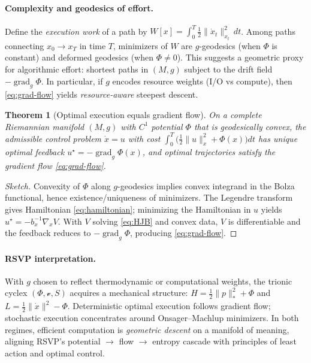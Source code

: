 \documentclass[12pt,a4paper]{article}
\theoremstyle{plain}
\newtheorem{theorem}{Theorem}[section]
\theoremstyle{definition}
\theoremstyle{remark}
\newcommand{\Phifield}{\Phi}
\newcommand{\vfield}{\mathcal{v}}
\newcommand{\Sfield}{S}
\begin{document}
\paragraph{Complexity and geodesics of effort.}
Define the \emph{execution work} of a path by $W[x]=\int_{0}^{T}\tfrac{1}{2}\|\dot x_t\|_{x_t}^{2}\,dt$. Among paths connecting $x_0\!\to\!x_T$ in time $T$, minimizers of $W$ are $g$-geodesics (when $\Phifield$ is constant) and deformed geodesics (when $\Phifield\neq 0$). This suggests a geometric proxy for algorithmic effort: shortest paths in $(M,g)$ subject to the drift field $-\operatorname{grad}_{g}\Phifield$. In particular, if $g$ encodes resource weights (I/O vs compute), then \eqref{eq:grad-flow} yields \emph{resource-aware} steepest descent.

\begin{theorem}[Optimal execution equals gradient flow]
\label{thm:optimal-equals-gradient}
On a complete Riemannian manifold $(M,g)$ with $C^{1}$ potential $\Phifield$ that is geodesically convex, the admissible control problem $\dot x=u$ with cost $\int_{0}^{T}\big(\tfrac{1}{2}\|u\|_{x}^{2}+\Phifield(x)\big)dt$ has unique optimal feedback $u^{\star}=-\operatorname{grad}_{g}\Phifield(x)$, and optimal trajectories satisfy the gradient flow \eqref{eq:grad-flow}.
\end{theorem}

\begin{proof}[Sketch]
Convexity of $\Phifield$ along $g$-geodesics implies convex integrand in the Bolza functional, hence existence/uniqueness of minimizers. The Legendre transform gives Hamiltonian \eqref{eq:hamiltonian}; minimizing the Hamiltonian in $u$ yields $u^{\star}=-b_x^{-1}\nabla_x V$. With $V$ solving \eqref{eq:HJB} and convex data, $V$ is differentiable and the feedback reduces to $-\operatorname{grad}_{g}\Phifield$, producing \eqref{eq:grad-flow}.
\end{proof}

\paragraph{RSVP interpretation.}
With $g$ chosen to reflect thermodynamic or computational weights, the trionic cyclex $(\Phifield,\vfield,\Sfield)$ acquires a mechanical structure: $H=\tfrac{1}{2}\|p\|_{*}^{2}+\Phifield$ and $L=\tfrac{1}{2}\|\dot x\|^{2}-\Phifield$. Deterministic optimal execution follows gradient flow; stochastic execution concentrates around Onsager–Machlup minimizers. In both regimes, efficient computation is \emph{geometric descent} on a manifold of meaning, aligning RSVP’s potential $\to$ flow $\to$ entropy cascade with principles of least action and optimal control.
\end{document}
